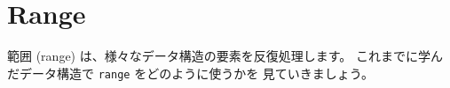 \section{Range}

範囲 (range) は、様々なデータ構造の要素を反復処理します。 これまでに学んだデータ構造で \texttt{range} をどのように使うかを 見ていきましょう。




